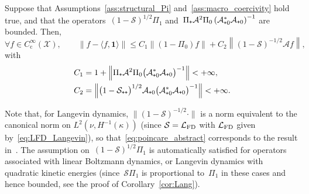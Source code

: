 \documentclass[AHL,Unicode,longabstracts,MathTools,published]{cedram}
\newcommand{\rmc}{\mathrm{c}}
\newcommand{\cLs}{\mathcal{S}}
\newcommand{\cLa}{\mathcal{A}}
\newcommand{\cX}{\mathcal{X}}
\newcommand{\bfun}{\mathbf{1}}
\newcommand{\cLFD}{\mathcal{L}_{\rm FD}}
\newcommand{\subplus}{\textnormal{\texttt{+}}}
\renewcommand{\leq}{\leqslant}
\let\oldforall\forall
\renewcommand*{\forall}{\mathrel{\oldforall}}
\begin{document}
\begin{prop}\label{prop:Poincare_static}
Suppose that Assumptions~\ref{ass:structural_Pi} and~\ref{ass:macro_coercivity} hold true, and that the operators~$(1-\cLs)^{1/2} \Pi_{1}$ and~$\Pi_\subplus \cLa^2 \Pi_0 \left(\cLa_{\subplus 0}^*\cLa_{\subplus 0}\right)^{-1}$ are bounded. Then,
\begin{equation}\label{eq:poincare_abstract}
\forall f \in C_\rmc^\infty(\cX), \qquad \left\| f - \langle f,\bfun\rangle \right\| \leq C_1 \left\| \left(1-\Pi_0\right)f \right\| + C_2 \left\| (1-\cLs)^{-1/2} \cLa f\right\|,
\end{equation}
with
\begin{equation}\label{eq:expression_C1_C2}
\begin{aligned}
C_1 & = 1+\left\|\Pi_\subplus \cLa^2 \Pi_0 \big(\cLa_{\subplus 0}^*\cLa_{\subplus 0}\big)^{-1}\right\| < +\infty, \\
C_2 & = \left\| \big(1-\cLs_{\subplus\subplus}\big)^{1/2} \cLa_{\subplus 0}\big(\cLa_{\subplus 0}^*\cLa_{\subplus 0}\big)^{-1} \right\| < +\infty.
\end{aligned}
\end{equation}
\end{prop}

Note that, for Langevin dynamics, $\| (1-\cLs)^{-1/2} \cdot\|$ is a norm equivalent to the canonical norm on $L^2(\nu,H^{-1}(\kappa))$ (since $\cLs = \cLFD$ with $\cLFD$ given by~\eqref{eq:LFD_Langevin}), so that~\eqref{eq:poincare_abstract} corresponds to the result in~\cite[Theorem~1.2]{AM19}. The assumption on~$(1-\cLs)^{1/2} \Pi_{1}$ is automatically satisfied for operators associated with linear Boltzmann dynamics, or Langevin dynamics with quadratic kinetic energies (since~$\cLs \Pi_1$ is proportional to~$\Pi_1$ in these cases and hence bounded, see the proof of Corollary~\ref{cor:Lang}).
\end{document}
